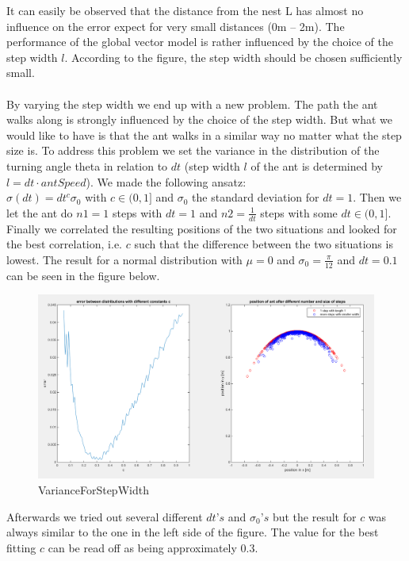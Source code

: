 \documentclass[11pt]{article}
\begin{document}
It can easily be observed that the distance from the nest L has almost no influence on the error expect for very small distances (0m – 2m). The performance of the global vector model is rather influenced by the choice of the step width $l$. According to the figure, the step width should be chosen sufficiently small.\\
\ \\
By varying the step width we end up with a new problem. The path the ant walks along is strongly influenced by the choice of the step width. But what we would like to have is that the ant walks in a similar way no matter what the step size is. 
To address this problem we set the variance in the distribution of the turning angle theta in relation to $dt$ (step width $l$ of the ant is determined by $l = dt\cdot antSpeed$). 
We made the following ansatz:\\
$\sigma(dt) = dt^{c}  \sigma_{0}$ with $c \in (0,1]$ and $\sigma_{0}$ the standard deviation for $dt = 1$.
Then we let the ant do $n1=1$ steps with $dt=1$ and $n2=\frac{1}{dt}$ steps with some $dt \in (0,1]$. Finally we correlated the resulting positions of the two situations and looked for the best correlation, i.e. $c$ such that the difference between the two situations is lowest. 
The result for a normal distribution with $\mu =0$ and $\sigma_{0} = \frac{\pi}{12}$ and $dt = 0.1$ can be seen in the figure below.

\begin{figure}[H]
\centering
\includegraphics[scale=0.36]{./Pics/VarianceForStepWidth_plot.png} 
\caption[VariacneForStepWidth]{VarianceForStepWidth}
\end{figure} 
Afterwards we tried out several different $dt’s$ and $\sigma_{0}’s$ but the result for $c$ was always similar to the one in the left side of the figure. The value for the best fitting $c$ can be read off as being approximately 0.3.
\end{document}
